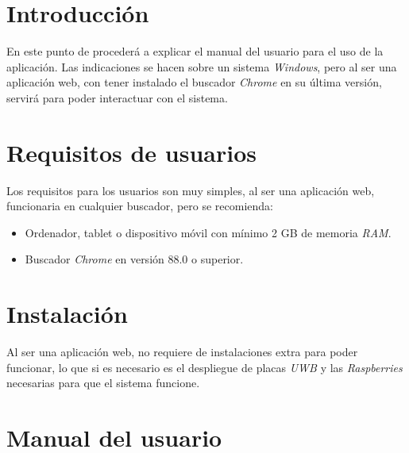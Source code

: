 
\section{Introducción}
En este punto de procederá a explicar el manual del usuario para el uso de la aplicación. Las indicaciones se hacen sobre un sistema \textit{Windows}, pero al ser una aplicación web, con tener instalado el buscador \textit{Chrome} en su última versión, servirá para poder interactuar con el sistema.

\section{Requisitos de usuarios}
Los requisitos para los usuarios son muy simples, al ser una aplicación web, funcionaria en cualquier buscador, pero se recomienda:
\begin{itemize}
    \item Ordenador, tablet o dispositivo móvil con mínimo 2 GB de memoria \textit{RAM}.
    \item Buscador \textit{Chrome} en versión 88.0 o superior.
\end{itemize}
\section{Instalación}
Al ser una aplicación web, no requiere de instalaciones extra para poder funcionar, lo que si es necesario es el despliegue de placas \textit{UWB} y las \textit{Raspberries} necesarias para que el sistema funcione.

\section{Manual del usuario}
